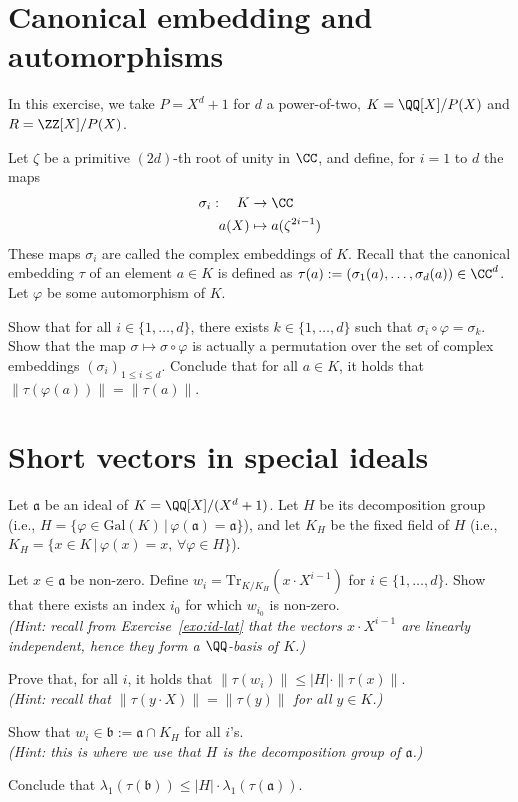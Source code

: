 \documentclass[11pt]{exam}
\theoremstyle{definition}
\begin{document}
\section{Canonical embedding and automorphisms}

In this exercise, we take $P = X^d+1$ for $d$ a power-of-two, $K = \QQ[X]/P(X)$ and $R = \ZZ[X]/P(X)$.

Let $\zeta$ be a primitive $(2d)$-th root of unity in $\CC$, and define, for $i = 1$ to $d$ the maps
\begin{align*}
\sigma_i: \ \ \ K &\rightarrow \CC \\
a(X) & \mapsto a(\zeta^{2i-1})
\end{align*}
These maps $\sigma_i$ are called the complex embeddings of $K$.
Recall that the canonical embedding $\tau$ of an element $a \in K$ is defined as $\tau(a) := (\sigma_1(a), \dots, \sigma_d(a)) \in \CC^d$.
%
Let $\varphi$ be some automorphism of $K$.

\begin{questions}
\question Show that for all $i \in \{1, \dots, d\}$, there exists $k \in \{1, \dots, d\}$ such that $\sigma_i \circ \varphi = \sigma_k$.
\question Show that the map $\sigma \mapsto \sigma \circ \varphi$ is actually a permutation over the set of complex embeddings $(\sigma_i)_{1 \leq i \leq d}$.
\question Conclude that for all $a \in K$, it holds that $\|\tau(\varphi(a))\| = \|\tau(a)\|$.
\end{questions}

\section{Short vectors in special ideals}

Let $\mathfrak{a}$ be an ideal of $K = \QQ[X]/(X^d+1)$. Let $H$ be its decomposition group (i.e., $H = \{\varphi \in \mathrm{Gal}(K)\,|\, \varphi(\mathfrak{a}) = \mathfrak{a}\}$), and let $K_H$ be the fixed field of $H$ (i.e., $K_H = \{x \in K \,|\, \varphi(x) = x, \, \forall \varphi \in H\}$).

\begin{questions}
\question Let $x \in \mathfrak{a}$ be non-zero. Define $w_i = \mathrm{Tr}_{K/K_H}(x \cdot X^{i-1})$ for $i \in \{1, \dots, d\}$. Show that there exists an index $i_0$ for which $w_{i_0}$ is non-zero.\\
\textit{\color{gray}(Hint: recall from Exercise~\ref{exo:id-lat} that the vectors $x \cdot X^{i-1}$ are linearly independent, hence they form a $\QQ$-basis of $K$.)}

\question Prove that, for all $i$, it holds that $\|\tau(w_i)\| \leq |H| \cdot \|\tau(x)\|$.\\
\textit{\color{gray}(Hint: recall that $\|\tau(y \cdot X)\| = \|\tau(y)\|$ for all $y \in K$.)}

\question Show that $w_i \in \mathfrak{b} := \mathfrak{a} \cap K_H$ for all $i$'s.\\
\textit{\color{gray}(Hint: this is where we use that $H$ is the decomposition group of $\mathfrak{a}$.)}

\question Conclude that $\lambda_1(\tau(\mathfrak{b})) \leq |H| \cdot \lambda_1(\tau(\mathfrak{a}))$.
\end{questions}
\end{document}
